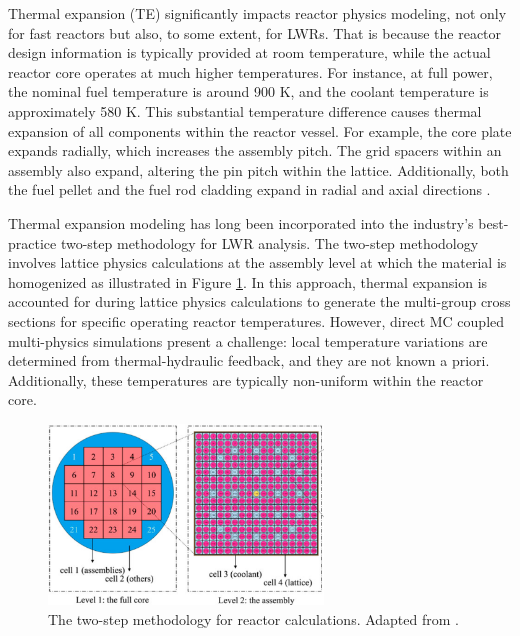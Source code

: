 Thermal expansion (TE) significantly impacts reactor physics modeling, not only for fast reactors but also, to some extent, for LWRs. That is because the reactor design information is typically provided at room temperature, while the actual reactor core operates at much higher temperatures. For instance, at full power, the nominal fuel temperature is around 900 K, and the coolant temperature is approximately 580 K. This substantial temperature difference causes thermal expansion of all components within the reactor vessel. For example, the core plate expands radially, which increases the assembly pitch. The grid spacers within an assembly also expand, altering the pin pitch within the lattice. Additionally, both the fuel pellet and the fuel rod cladding expand in radial and axial directions \cite{palmtag}.

Thermal expansion modeling has long been incorporated into the industry's best-practice two-step methodology for LWR analysis. The two-step methodology involves lattice physics calculations at the assembly level at which the material is homogenized as illustrated in Figure \ref{fig_1x}. In this approach, thermal expansion is accounted for during lattice physics calculations to generate the multi-group cross sections for specific operating reactor temperatures. However, direct MC coupled multi-physics simulations present a challenge: local temperature variations are determined from thermal-hydraulic feedback, and they are not known a priori. Additionally, these temperatures are typically non-uniform within the reactor core.

\begin{figure}
    \centering
    \includegraphics[width=0.65\textwidth]{figs/two_step.png}
    \caption[The two-step methodology for reactor calculations.]{The two-step methodology for reactor calculations. Adapted from \cite{li_2023}.}
    \label{fig_1x}
\end{figure}

